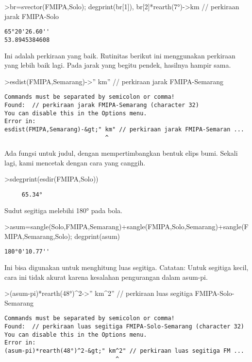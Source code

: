\documentclass[
]{book}
\begin{document}
\textgreater br=svector(FMIPA,Solo); degprint(br{[}1{]}), br{[}2{]}*rearth(7°)-\textgreater km // perkiraan jarak FMIPA-Solo

\begin{verbatim}
65°20'26.60''
53.8945384608
\end{verbatim}

Ini adalah perkiraan yang baik. Rutinitas berikut ini menggunakan perkiraan yang lebih baik lagi. Pada jarak yang begitu pendek, hasilnya hampir sama.

\textgreater esdist(FMIPA,Semarang)-\textgreater'' km'' // perkiraan jarak FMIPA-Semarang

\begin{verbatim}
Commands must be separated by semicolon or comma!
Found:  // perkiraan jarak FMIPA-Semarang (character 32)
You can disable this in the Options menu.
Error in:
esdist(FMIPA,Semarang)-&gt;" km" // perkiraan jarak FMIPA-Semaran ...
                             ^
\end{verbatim}

Ada fungsi untuk judul, dengan mempertimbangkan bentuk elips bumi. Sekali lagi, kami mencetak dengan cara yang canggih.

\textgreater sdegprint(esdir(FMIPA,Solo))

\begin{verbatim}
     65.34°
\end{verbatim}

Sudut segitiga melebihi 180° pada bola.

\textgreater asum=sangle(Solo,FMIPA,Semarang)+sangle(FMIPA,Solo,Semarang)+sangle(FMIPA,Semarang,Solo); degprint(asum)

\begin{verbatim}
180°0'10.77''
\end{verbatim}

Ini bisa digunakan untuk menghitung luas segitiga. Catatan: Untuk segitiga kecil, cara ini tidak akurat karena kesalahan pengurangan dalam asum-pi.

\textgreater(asum-pi)*rearth(48°)\^{}2-\textgreater'' km\^{}2'' // perkiraan luas segitiga FMIPA-Solo-Semarang

\begin{verbatim}
Commands must be separated by semicolon or comma!
Found:  // perkiraan luas segitiga FMIPA-Solo-Semarang (character 32)
You can disable this in the Options menu.
Error in:
(asum-pi)*rearth(48°)^2-&gt;" km^2" // perkiraan luas segitiga FM ...
                                ^
\end{verbatim}
\end{document}
